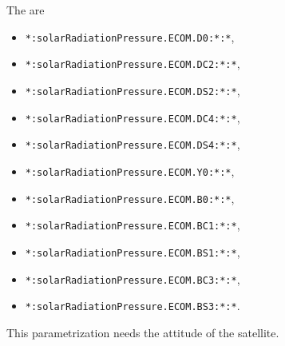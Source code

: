 The  are
\begin{itemize}
\item \verb|*:solarRadiationPressure.ECOM.D0:*:*|,
\item \verb|*:solarRadiationPressure.ECOM.DC2:*:*|,
\item \verb|*:solarRadiationPressure.ECOM.DS2:*:*|,
\item \verb|*:solarRadiationPressure.ECOM.DC4:*:*|,
\item \verb|*:solarRadiationPressure.ECOM.DS4:*:*|,
\item \verb|*:solarRadiationPressure.ECOM.Y0:*:*|,
\item \verb|*:solarRadiationPressure.ECOM.B0:*:*|,
\item \verb|*:solarRadiationPressure.ECOM.BC1:*:*|,
\item \verb|*:solarRadiationPressure.ECOM.BS1:*:*|,
\item \verb|*:solarRadiationPressure.ECOM.BC3:*:*|,
\item \verb|*:solarRadiationPressure.ECOM.BS3:*:*|.
\end{itemize}

This parametrization needs the attitude of the satellite.


